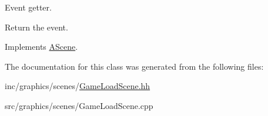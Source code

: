 Event getter. 

Return the event. 

Implements \hyperlink{classAScene_af521e5e6d30a5d2e5d30eb333e4d3abd}{A\+Scene}.



The documentation for this class was generated from the following files\+:\begin{DoxyCompactItemize}
\item 
inc/graphics/scenes/\hyperlink{GameLoadScene_8hh}{Game\+Load\+Scene.\+hh}\item 
src/graphics/scenes/Game\+Load\+Scene.\+cpp\end{DoxyCompactItemize}
